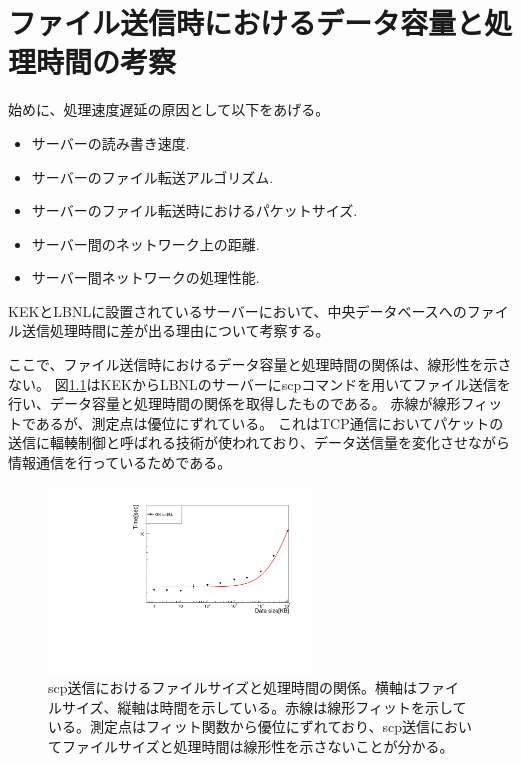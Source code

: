 \chapter{ファイル送信時におけるデータ容量と処理時間の考察} \label{chap:data_time_detail}

始めに、処理速度遅延の原因として以下をあげる。
\begin{itemize}
  \item サーバーの読み書き速度.
  \item サーバーのファイル転送アルゴリズム.
  \item サーバーのファイル転送時におけるパケットサイズ.
  \item サーバー間のネットワーク上の距離.
  \item サーバー間ネットワークの処理性能.
\end{itemize}

KEKとLBNLに設置されているサーバーにおいて、中央データベースへのファイル送信処理時間に差が出る理由について考察する。

ここで、ファイル送信時におけるデータ容量と処理時間の関係は、線形性を示さない。
図\ref{datasize_vs_time_scp}はKEKからLBNLのサーバーにscpコマンドを用いてファイル送信を行い、データ容量と処理時間の関係を取得したものである。
赤線が線形フィットであるが、測定点は優位にずれている。
これはTCP通信においてパケットの送信に輻輳制御\cite{e-1}と呼ばれる技術が使われており、データ送信量を変化させながら情報通信を行っているためである。

\begin{figure}[bpt]\centering
  \begin{center}
    \includegraphics[width=7cm,angle=270]{./datasize_vs_time_scp.pdf}
  \caption[scp送信におけるファイルサイズと処理時間の関係]{scp送信におけるファイルサイズと処理時間の関係。横軸はファイルサイズ、縦軸は時間を示している。赤線は線形フィットを示している。測定点はフィット関数から優位にずれており、scp送信においてファイルサイズと処理時間は線形性を示さないことが分かる。}
  \label{datasize_vs_time_scp}
  \end{center}
\end{figure}

